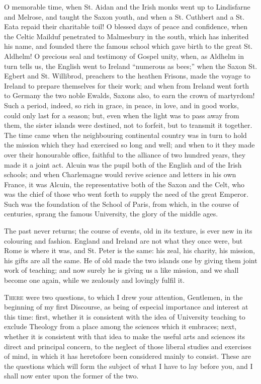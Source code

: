 O memorable time, when St. Aidan and the Irish monks went up
to Lindisfarne and Melrose, and taught the Saxon youth, and when a St.
Cuthbert and a St. Eata repaid their charitable toil! O blessed days
of peace and confidence, when the Celtic Mailduf penetrated to
Malmesbury in the south, which has inherited his name, and founded
there the famous school which gave birth to the great St. Aldhelm! O
precious seal and testimony of Gospel unity, when, as Aldhelm in turn
tells us, the English went to Ireland ``numerous as bees;''
when the Saxon St. Egbert and St. Willibrod, preachers to the heathen
Frisons, made the voyage to Ireland to prepare themselves for their
work; and when from Ireland went forth to Germany the two noble Ewalds,
Saxons also, to earn the crown of martyrdom! Such a period, indeed, so
rich in grace, in peace, in love, and in good works, could only last
for a season; but, even when the light was to pass away from them, the
sister islands were destined, not to forfeit, but to transmit it
together. The time came when the neighbouring continental country was
in turn to hold the mission which they had exercised so long and well;
and when to it they made over their honourable office, faithful to the
alliance of two hundred years, they made it a joint act. Alcuin was
the pupil both of the English and of the Irish schools; and when
Charlemagne would revive science and letters in his own France, it was
Alcuin, the representative both of the Saxon and the Celt, who was the
chief of those who went forth to supply the need of the great Emperor.
Such was the foundation of the School of Paris, from which, in the
course of centuries, sprang the famous University, the glory of the
middle ages.

The past never returns; the course of events, old in its
texture, is ever new in its colouring and fashion. England and Ireland
are not what they once were, but Rome is where it was, and St. Peter
is the same: his zeal, his charity, his mission, his gifts are all the
same. He of old made the two islands one by giving them joint work of
teaching; and now surely he is giving us a like mission, and we shall
become one again, while we zealously and lovingly fulfil it.


T\textsc{here} were two questions, to which I drew your attention,
Gentlemen, in the beginning of my first Discourse, as being of
especial importance and interest at this time: first, whether it is
consistent with the idea of University teaching to exclude Theology
from a place among the sciences which it embraces; next, whether it is
consistent with that idea to make the useful arts and sciences its
direct and principal concern, to the neglect of those liberal studies
and exercises of mind, in which it has heretofore been considered
mainly to consist. These are the questions which will form the subject
of what I have to lay before you, and I shall now enter upon the
former of the two.


